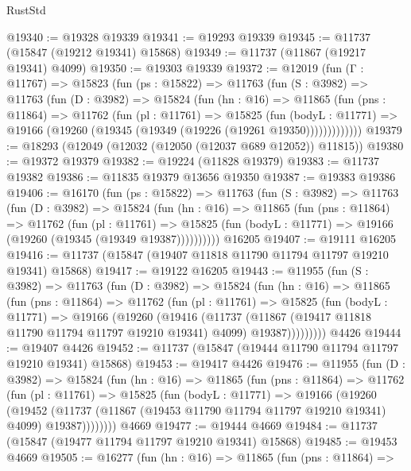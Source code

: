 \begin{lexlean}{RustStd}
\begin{coremodule}
@19340 := @19328 @19339
@19341 := @19293 @19339
@19345 := @11737 (@15847 (@19212 @19341) @15868)
@19349 := @11737 (@11867 (@19217 @19341) @4099)
@19350 := @19303 @19339
@19372 := @12019
    (fun (Γ : @11767) =>
    @15823
      (fun (ps : @15822) =>
      @11763
        (fun (S : @3982) =>
        @11763
          (fun (D : @3982) =>
          @15824
            (fun (hn : @16) =>
            @11865
              (fun (pns : @11864) =>
              @11762
                (fun (pl : @11761) =>
                @15825
                  (fun (bodyL : @11771) =>
                  @19166 (@19260 (@19345 (@19349 (@19226 (@19261 @19350)))))))))))))
@19379 := @18293 (@12049 (@12032 (@12050 (@12037 @689 @12052)) @11815))
@19380 := @19372 @19379
@19382 := @19224 (@11828 @19379)
@19383 := @11737 @19382
@19386 := @11835 @19379 @13656 @19350
@19387 := @19383 @19386
@19406 := @16170
    (fun (ps : @15822) =>
    @11763
      (fun (S : @3982) =>
      @11763
        (fun (D : @3982) =>
        @15824
          (fun (hn : @16) =>
          @11865
            (fun (pns : @11864) =>
            @11762
              (fun (pl : @11761) =>
              @15825 (fun (bodyL : @11771) => @19166 (@19260 (@19345 (@19349 @19387))))))))))
    @16205
@19407 := @19111 @16205
@19416 := @11737 (@15847 (@19407 @11818 @11790 @11794 @11797 @19210 @19341) @15868)
@19417 := @19122 @16205
@19443 := @11955
    (fun (S : @3982) =>
    @11763
      (fun (D : @3982) =>
      @15824
        (fun (hn : @16) =>
        @11865
          (fun (pns : @11864) =>
          @11762
            (fun (pl : @11761) =>
            @15825
              (fun (bodyL : @11771) =>
              @19166
                (@19260
                  (@19416
                    (@11737
                      (@11867 (@19417 @11818 @11790 @11794 @11797 @19210 @19341) @4099)
                      @19387)))))))))
    @4426
@19444 := @19407 @4426
@19452 := @11737 (@15847 (@19444 @11790 @11794 @11797 @19210 @19341) @15868)
@19453 := @19417 @4426
@19476 := @11955
    (fun (D : @3982) =>
    @15824
      (fun (hn : @16) =>
      @11865
        (fun (pns : @11864) =>
        @11762
          (fun (pl : @11761) =>
          @15825
            (fun (bodyL : @11771) =>
            @19166
              (@19260
                (@19452
                  (@11737 (@11867 (@19453 @11790 @11794 @11797 @19210 @19341) @4099) @19387))))))))
    @4669
@19477 := @19444 @4669
@19484 := @11737 (@15847 (@19477 @11794 @11797 @19210 @19341) @15868)
@19485 := @19453 @4669
@19505 := @16277
    (fun (hn : @16) =>
    @11865
      (fun (pns : @11864) =>

\end{coremodule}
\end{lexlean}
